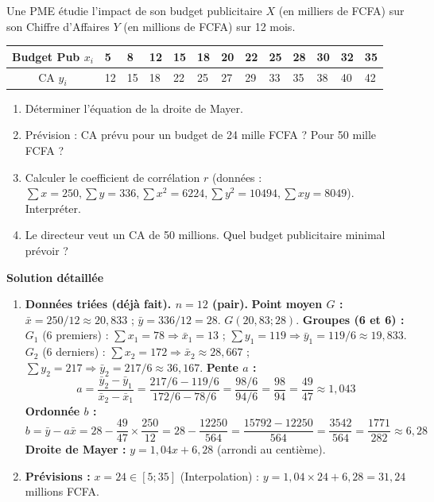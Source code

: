 \documentclass[11pt]{article}
\begin{document}
\begin{exoresolu}
Une PME étudie l'impact de son budget publicitaire $X$ (en milliers de FCFA) sur son Chiffre d'Affaires $Y$ (en millions de FCFA) sur 12 mois.
\begin{center}
\begin{tabularx}{\linewidth}{|c|*{12}{X|}}\hline
Budget Pub $x_i$ & 5 & 8 & 12 & 15 & 18 & 20 & 22 & 25 & 28 & 30 & 32 & 35 \\ \hline
CA $y_i$ & 12 & 15 & 18 & 22 & 25 & 27 & 29 & 33 & 35 & 38 & 40 & 42 \\ \hline
\end{tabularx}
\end{center}
\begin{enumerate}
    \item Déterminer l'équation de la droite de Mayer.
    \item Prévision : CA prévu pour un budget de 24 mille FCFA ? Pour 50 mille FCFA ?
    \item Calculer le coefficient de corrélation $r$ (données : $\sum x = 250, \sum y = 336, \sum x^2 = 6224, \sum y^2 = 10494, \sum xy = 8049$). Interpréter.
    \item Le directeur veut un CA de 50 millions. Quel budget publicitaire minimal prévoir ?
\end{enumerate}
\tcblower
\textbf{Solution détaillée}
\begin{enumerate}
    \item \textbf{Données triées (déjà fait). $n=12$ (pair).}
    \textbf{Point moyen $G$ :} $\bar{x} = 250/12 \approx 20,833$ ; $\bar{y} = 336/12 = 28$. $G(20,83 ; 28)$.
    \textbf{Groupes (6 et 6) :}
    $G_1$ (6 premiers) : $\sum x_1 = 78 \Rightarrow \bar{x}_1 = 13$ ; $\sum y_1 = 119 \Rightarrow \bar{y}_1 = 119/6 \approx 19,833$.
    $G_2$ (6 derniers) : $\sum x_2 = 172 \Rightarrow \bar{x}_2 \approx 28,667$ ; $\sum y_2 = 217 \Rightarrow \bar{y}_2 = 217/6 \approx 36,167$.
    \textbf{Pente $a$ :}
    \[ a = \frac{\bar{y}_2 - \bar{y}_1}{\bar{x}_2 - \bar{x}_1} = \frac{217/6 - 119/6}{172/6 - 78/6} = \frac{98/6}{94/6} = \frac{98}{94} = \frac{49}{47} \approx 1,043 \]
    \textbf{Ordonnée $b$ :}
    \[ b = \bar{y} - a\bar{x} = 28 - \frac{49}{47} \times \frac{250}{12} = 28 - \frac{12250}{564} = \frac{15792 - 12250}{564} = \frac{3542}{564} = \frac{1771}{282} \approx 6,28 \]
    \textbf{Droite de Mayer :} $\boxed{y = 1,04x + 6,28}$ (arrondi au centième).
    \item \textbf{Prévisions :}
    $x=24 \in [5;35]$ (Interpolation) : $y = 1,04 \times 24 + 6,28 = 31,24$ millions FCFA.

\end{enumerate}
\end{exoresolu}
\end{document}
